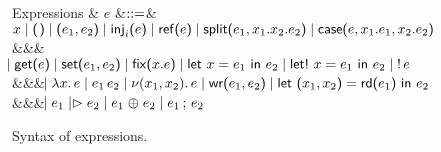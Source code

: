 \begin{figure*}
  \begin{grammar}
    Expressions
    & $e$
        &$\bnfas$&
        $\eVar{x} \bnfalt \eUnit \bnfalt \ePair{e_1}{e_2} \bnfalt \eInj{i}{e}
    \bnfalt \eRef{e} \bnfalt \eSplit{e_1}{x_1}{x_2}{e_2} \bnfalt
    \eCase{e}{x_1}{e_1}{x_2}{e_2}$
    \\ &&& $\bnfaltbrk \eGet{e} \bnfalt \eSet{e_1}{e_2} \bnfalt \eFix{x}{e}
    \bnfalt \eLet{x}{e_1}{e_2} \bnfalt \eLetBang{x}{e_1}{e_2} \bnfalt \eBang{e}$
    \\ &&& $\bnfaltbrk \eLam{x}{e} \bnfalt \eApp{e_1}{e_2} \bnfalt \eNu{(x_1,
      x_2)}{e} \bnfalt \eWr{e_1}{e_2} \bnfalt \eLetRd{x_1}{x_2}{e_1}{e_2}$
    \\ &&& $\bnfaltbrk \eFork{e_1}{e_2} \bnfalt \eChoice{e_1}{e_2} \bnfalt
    \eSeq{e_1}{e_2}$
  \end{grammar}
  \caption{Syntax of expressions.}
  \label{fig:ilc-syntax}
\end{figure*}
